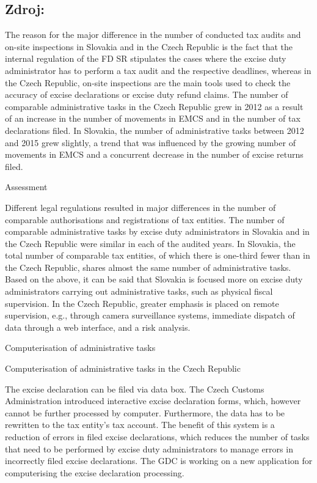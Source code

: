 \documentclass[10pt]{article}
\begin{document}
\subsection*{Zdroj:}

The reason for the major difference in the number of conducted tax audits and on-site inspections in Slovakia and in the Czech Republic is the fact that the internal regulation of the FD SR stipulates the cases where the excise duty administrator has to perform a tax audit and the respective deadlines, whereas in the Czech Republic, on-site inspections are the main tools used to check the accuracy of excise declarations or excise duty refund claims.
The number of comparable administrative tasks in the Czech Republic grew in 2012 as a result of an increase in the number of movements in EMCS and in the number of tax declarations filed.
In Slovakia, the number of administrative tasks between 2012 and 2015 grew slightly, a trend that was influenced by the growing number of movements in EMCS and a concurrent decrease in the number of excise returns filed.


Assessment

Different legal regulations resulted in major differences in the number of comparable authorisations and registrations of tax entities.
The number of comparable administrative tasks by excise duty administrators in Slovakia and in the Czech Republic were similar in each of the audited years.
In Slovakia, the total number of comparable tax entities, of which there is one-third fewer than in the Czech Republic, shares almost the same number of administrative tasks.
Based on the above, it can be said that Slovakia is focused more on excise duty administrators carrying out administrative tasks, such as physical fiscal supervision.
In the Czech Republic, greater emphasis is placed on remote supervision, e.g., through camera surveillance systems, immediate dispatch of data through a web interface, and a risk analysis.


Computerisation of administrative tasks



Computerisation of administrative tasks in the Czech Republic

The excise declaration can be filed via data box.
The Czech Customs Administration introduced interactive excise declaration forms, which, however cannot be further processed by computer.
Furthermore, the data has to be rewritten to the tax entity’s tax account.
The benefit of this system is a reduction of errors in filed excise declarations, which reduces the number of tasks that need to be performed by excise duty administrators to manage errors in incorrectly filed excise declarations.
The GDC is working on a new application for computerising the excise declaration processing.
\end{document}
